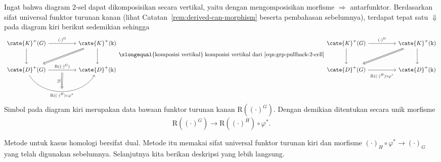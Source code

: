 Ingat bahwa diagram 2-sel dapat dikomposisikan secara vertikal, yaitu dengan
mengomposisikan morfisme $\Rightarrow$ antarfunktor. Berdasarkan sifat
universal funktor turunan kanan (lihat Catatan~\ref{rem:derived-can-morphism}
beserta pembahasan sebelumnya), terdapat tepat satu $\Downarrow$ pada diagram
kiri berikut sedemikian sehingga
\begin{equation}\label{eqn:change-of-groups-univ}
	\begin{tikzcd}[column sep=huge, row sep=large]
		\cate{K}^+(G) \arrow[r, "{(\cdot)^G}"] \arrow[d] & \cate{K}^+(\Bbbk) \arrow[d] \arrow[Rightarrow, ld] \\
		\cate{D}^+(G) \arrow[r, "{\mathrm{R}((\cdot)^G)}", ""' {name=D}] \arrow[r, bend right=60, "" {name=U}, "{\mathrm{R}((\cdot)^H) \circ \varphi^*}"'] & \cate{D}^+(\Bbbk) \arrow[Rightarrow, from=D, to=U, "{\exists!}"']
	\end{tikzcd} \xlongequal{\text{komposisi vertikal}} \;\text{komposisi vertikal dari \eqref{eqn:grp-pullback-2-cell}}
	\begin{tikzcd}[column sep=huge, row sep=large]
		\cate{K}^+(G) \arrow[r, "{(\cdot)^G}"] \arrow[d] & \cate{K}^+(\Bbbk) \arrow[d] \arrow[Rightarrow, ld] \\
		\cate{D}^+(G) \arrow[r, "{\mathrm{R}((\cdot)^H) \circ \varphi^*}"' inner sep=0.6em] & \cate{D}^+(\Bbbk)
	\end{tikzcd}
\end{equation}
Simbol  pada diagram kiri merupakan data
bawaan funktor turunan kanan $\mathrm{R}\left((\cdot)^G\right)$. Dengan
demikian ditentukan secara unik morfisme
\[ \mathrm{R}\left( (\cdot)^G \right) \to \mathrm{R}\left((\cdot)^H \right) \circ \varphi^* . \]

Metode untuk kasus homologi bersifat dual. Metode itu memakai sifat universal
funktor turunan kiri dan morfisme
$(\cdot)_H\circ\varphi^*\to(\cdot)_G$ yang telah digunakan sebelumnya.
Selanjutnya kita berikan deskripsi yang lebih langsung.

